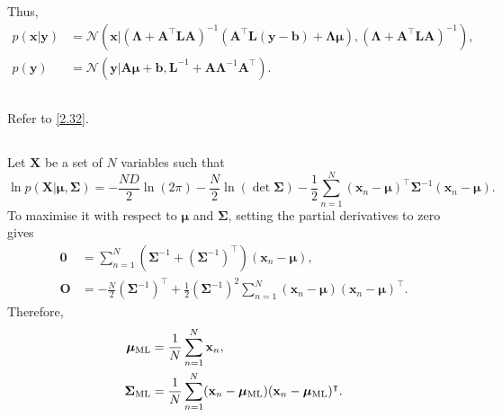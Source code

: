 %
Thus,
%
\begin{equation}
\begin{aligned}
p(\mathbf{x} | \mathbf{y})
&=
\mathcal{N}
\left(
	\mathbf{x}
	|
	\left( 
		\bm{\Lambda}
		+
		\mathbf{A} ^ \intercal
		\mathbf{L}
		\mathbf{A}
	\right) ^ {- 1}
	\left(
		\mathbf{A} ^ \intercal
		\mathbf{L}
		(\mathbf{y} - \mathbf{b})
		+
		\bm{\Lambda}
		\bm{\mu}
	\right),
	\left( 
		\bm{\Lambda}
		+
		\mathbf{A} ^ \intercal
		\mathbf{L}
		\mathbf{A}
	\right) ^ {- 1}
\right),
\\
p(\mathbf{y})
&=
\mathcal{N}
\left(
	\mathbf{y}
	|
	\mathbf{A}
	\bm{\mu}
	+
	\mathbf{b},
	\mathbf{L} ^ {- 1}
	+
	\mathbf{A}
	\bm{\Lambda} ^ {- 1}
	\mathbf{A} ^ \intercal
\right).
\end{aligned}
\end{equation}
%


\subsection{}
\label{2.33}
Refer to \ref{2.32}.


\subsection{}
\label{2.34}
Let $\mathbf{X}$ be a set of $N$ variables such that
%
\begin{equation}
\ln p
\left(
	\mathbf{X}
	|
	\bm{\mu},
	\bm{\Sigma}
\right)
=
-
\frac{N D}{2}
\ln (2 \pi)
-
\frac{N}{2}
\ln (\det \bm{\Sigma})
-
\frac{1}{2}
\sum_{n = 1}^{N}
(\mathbf{x}_n - \bm{\mu}) ^ \intercal
\bm{\Sigma} ^ {- 1}
(\mathbf{x}_n - \bm{\mu}).
\end{equation}
%
To maximise it with respect to $\bm{\mu}$ and $\bm{\Sigma}$, setting the partial derivatives to zero gives
%
\begin{equation}
\begin{aligned}
\mathbf{0}
&= 
\sum_{n = 1}^{N}
\left(
	\bm{\Sigma} ^ {- 1}
	+
	\left(
		\bm{\Sigma} ^ {- 1}
	\right) ^ \intercal
\right)
(\mathbf{x}_n - \bm{\mu}),
\\
\mathbf{O}
&=
-
\frac{N}{2}
\left( 
	\bm{\Sigma} ^ {- 1}
\right) ^ \intercal
+
\frac{1}{2}
\left( \bm{\Sigma} ^ {- 1} \right) ^ 2
\sum_{n = 1}^{N}
(\mathbf{x}_n - \bm{\mu})
(\mathbf{x}_n - \bm{\mu}) ^ \intercal.
\end{aligned}
\end{equation}
%
Therefore,
%
\begin{equation}
\begin{aligned}
\bm{\mu}_{{\rm ML}}
&= 
\frac{1}{N}
\sum_{n = 1}^{N} 
\mathbf{x}_n,
\\
\bm{\Sigma}_{{\rm ML}}
&=
\frac{1}{N}
\sum_{n = 1}^{N}
(\mathbf{x}_n - \bm{\mu}_{\rm ML})
(\mathbf{x}_n - \bm{\mu}_{\rm ML}) ^ \intercal.
\end{aligned}
\end{equation}
%


